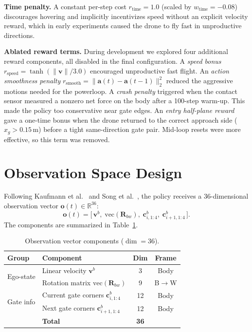 \documentclass[conference]{IEEEtran}
\begin{document}
\textbf{Time penalty.}
A constant per-step cost $r_{\text{time}} = 1.0$ (scaled by $w_{\text{time}}=-0.08$) discourages hovering and implicitly incentivizes speed without an explicit velocity reward, which in early experiments caused the drone to fly fast in unproductive directions.

\textbf{Ablated reward terms.}
During development we explored four additional reward components, all disabled in the final configuration. A \emph{speed bonus} $r_{\text{speed}} = \tanh(\|\mathbf{v}\|/3.0)$ encouraged unproductive fast flight. An \emph{action smoothness penalty} $r_{\text{smooth}} = \|\mathbf{a}(t) - \mathbf{a}(t{-}1)\|_2^2$ reduced the aggressive motions needed for the powerloop. A \emph{crash penalty} triggered when the contact sensor measured a nonzero net force on the body after a 100-step warm-up. This made the policy too conservative near gate edges. An \emph{entry half-plane reward} gave a one-time bonus when the drone returned to the correct approach side ($x_g > 0.15$\,m) before a tight same-direction gate pair. Mid-loop resets were more effective, so this term was removed.

\section{Observation Space Design}

Following Kaufmann et al.~\cite{kaufmann2023champion} and Song et al.~\cite{song2023reaching}, the policy receives a 36-dimensional observation vector $\mathbf{o}(t) \in \mathbb{R}^{36}$:
\begin{equation}\label{eq:obs}
  \mathbf{o}(t) = \bigl[\,\mathbf{v}^b,\;\text{vec}(\mathbf{R}_{bw}),\;\mathbf{c}^b_{i,1{:}4},\;\mathbf{c}^b_{i{+}1,1{:}4}\,\bigr].
\end{equation}
The components are summarized in Table~\ref{tab:obs}.

\begin{table}[h]
\centering
\caption{Observation vector components ($\dim = 36$).}
\label{tab:obs}
\begin{tabular}{@{}llcc@{}}
\toprule
\textbf{Group} & \textbf{Component} & \textbf{Dim} & \textbf{Frame} \\
\midrule
\multirow{2}{*}{Ego-state}
  & Linear velocity $\mathbf{v}^b$ & 3 & Body \\
  & Rotation matrix $\text{vec}(\mathbf{R}_{bw})$ & 9 & B$\to$W \\
\midrule
\multirow{2}{*}{Gate info}
  & Current gate corners $\mathbf{c}^b_{i,1{:}4}$ & 12 & Body \\
  & Next gate corners $\mathbf{c}^b_{i{+}1,1{:}4}$ & 12 & Body \\
\midrule
  & \textbf{Total} & \textbf{36} & \\
\bottomrule
\end{tabular}
\end{table}
\end{document}
